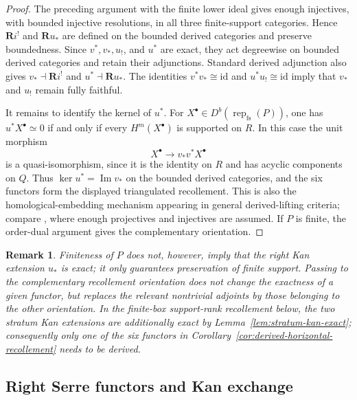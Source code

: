\documentclass[10pt,a4paper]{amsart}
\newtheorem{remark}[theorem]{Remark}
\newcommand{\Rep}{\operatorname{rep}}
\begin{document}
\begin{proof}
The preceding argument with the finite lower ideal gives enough injectives, with
bounded injective resolutions, in all three finite-support categories.  Hence
$\mathbf R i^!$ and $\mathbf R u_*$ are defined on the bounded derived
categories and preserve boundedness.  Since $v^*,v_*,u_!$, and $u^*$ are
exact, they act degreewise on bounded derived categories and retain their
adjunctions.  Standard derived adjunction also gives
$v_*\dashv\mathbf R i^!$ and $u^*\dashv\mathbf R u_*$.  The identities
$v^*v_*\cong\mathrm{id}$ and $u^*u_!\cong\mathrm{id}$ imply that $v_*$ and
$u_!$ remain fully faithful.

It remains to identify the kernel of $u^*$.  For
$X^\bullet\in D^b(\Rep_{\mathrm{fs}}(P))$, one has $u^*X^\bullet\simeq0$
if and only if every $H^m(X^\bullet)$ is supported on $R$.  In this case the
unit morphism
\[
X^\bullet\longrightarrow v_*v^*X^\bullet
\]
is a quasi-isomorphism, since it is the identity on $R$ and has acyclic
components on $Q$.  Thus
$\ker u^*=\operatorname{Im}v_*$ on the bounded derived categories, and the six
functors form the displayed triangulated recollement.  This is also the
homological-embedding mechanism appearing in general derived-lifting criteria;
compare \cite[Theorem~7.2]{Psaroudakis}, where enough projectives and
injectives are assumed.  If $P$ is finite, the order-dual argument gives the
complementary orientation.
\end{proof}

\begin{remark}\label{rem:finite-kan-not-exact}
Finiteness of $P$ does not, however, imply that the right Kan extension $u_*$
is exact; it only guarantees preservation of finite support.  Passing to the
complementary recollement orientation does not change the exactness of a given
functor, but replaces the relevant nontrivial adjoints by those belonging to
the other orientation.  In the finite-box support-rank recollement below, the
two stratum Kan extensions are additionally exact by
Lemma~\ref{lem:stratum-kan-exact}; consequently only one of the six functors
in Corollary~\ref{cor:derived-horizontal-recollement} needs to be derived.
\end{remark}

\subsection{Right Serre functors and Kan exchange}
\end{document}
